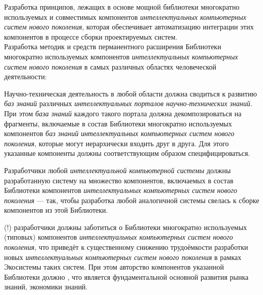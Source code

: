 \begin{textitemize}
	\medskip
	\item Разработка принципов, лежащих в основе мощной библиотеки многократно используемых и совместимых компонентов \textit{интеллектуальных компьютерных систем нового поколения}, которая обеспечивает  автоматизацию интеграции этих компонентов в процессе сборки проектируемых систем.\\
	Разработка методик и средств перманентного расширения Библиотеки многократно используемых компонентов \textit{интеллектуальных компьютерных систем нового поколения} в самых различных областях человеческой деятельности:
	\begin{textitemize}
		\item Научно-техническая деятельность в любой области должна сводиться к развитию \textit{баз знаний} различных \textit{интеллектуальных порталов научно-технических знаний}. При этом \textit{база знаний} каждого такого портала должна декомпозироваться на фрагменты, включаемые в состав Библиотеки многократно используемых компонентов \textit{баз знаний} \textit{интеллектуальных компьютерных систем нового поколения}, которые могут иерархически входить друг в друга. Для этого указанные компоненты должны соответствующим образом специфицироваться.
		\item Разработчики любой \textit{интеллектуальной компьютерной системы} должны  разработанную систему на множество компонентов, включаемых в состав Библиотеки компонентов\textit{ интеллектуальных компьютерных систем нового поколения} --- так, чтобы разработка любой аналогичной системы свелась к сборке компонентов из этой Библиотеки.
		\item {}(!) разработчики должны заботиться о  Библиотеки многократно используемых (типовых) компонентов \textit{интеллектуальных компьютерных систем нового поколения}, что приведёт к существенному снижению трудоёмкости разработки новых \textit{интеллектуальных компьютерных систем нового поколения} в рамках Экосистемы таких систем. При этом авторство компонентов  указанной Библиотеки должно , что является фундаментальной основной развития рынка знаний, экономики знаний. 
		

\end{textitemize}
\end{textitemize}
